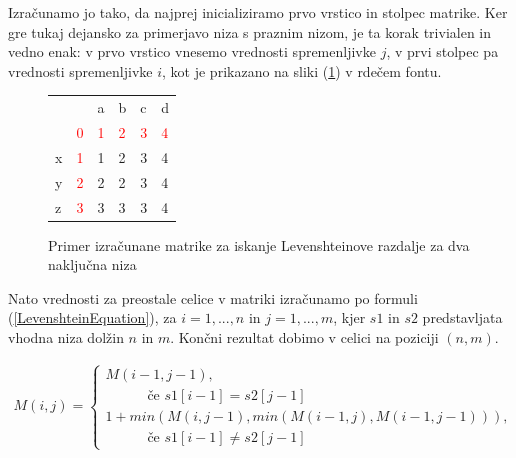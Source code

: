 \documentclass[a4paper,12pt,openright]{book}
\begin{document}
Izračunamo jo tako, da najprej inicializiramo prvo vrstico in stolpec matrike. Ker gre tukaj dejansko za primerjavo niza s praznim nizom, je ta korak trivialen in vedno enak: v prvo vrstico vnesemo vrednosti spremenljivke $j$, v prvi stolpec pa vrednosti spremenljivke $i$, kot je prikazano na sliki (\ref{levenshteinExample}) v rdečem fontu.

\begin{figure}[htb]
\begin{center}
\begin{tabular}{|l|l|l|l|l|l|}
\cline{3-6}
  \multicolumn{2}{c|}{}  & a & b & c & d\\ \cline{2-6}
 \multicolumn{1}{c|}{} & \textcolor{red}{0} & \textcolor{red}{1} & \textcolor{red}{2} & \textcolor{red}{3} & \textcolor{red}{4}\\ \hline
x  & \textcolor{red}{1}  & \cellcolor{blue!15}1 &  2 & 3 & 4\\ \hline
y  & \textcolor{red}{2} & 2 & \cellcolor{blue!15}2 & 3 & 4\\ \hline
z  & \textcolor{red}{3} & 3 & 3 & \cellcolor{blue!15}3 & \cellcolor{blue!25}4 \\ \hline
\end{tabular}

\end{center}
\caption{Primer izračunane matrike za iskanje Levenshteinove razdalje za dva naključna niza}
\label{levenshteinExample}
\end{figure}

Nato vrednosti za preostale celice v matriki izračunamo po formuli (\ref{LevenshteinEquation}), za $i=1,...,n$ in $j=1,...,m$, kjer $s1$ in $s2$ predstavljata vhodna niza dolžin $n$ in $m$. Končni rezultat dobimo v celici na poziciji $(n, m)$. 

\bigskip \bigskip

\begin{equation}
\label{LevenshteinEquation}
\begin{aligned}
M(i, j) =
\begin{cases}
     M(i-1, j-1) ,     \\ \quad \quad \quad \text{če } s1[i-1]=s2[j-1]\\
     1 + min(M(i, j-1), min(M(i-1, j), M(i-1, j-1))) , \\ \quad \quad \quad \text{če } s1[i-1] \neq s2[j-1]
  \end{cases}
\end{aligned}
\end{equation}
\end{document}

